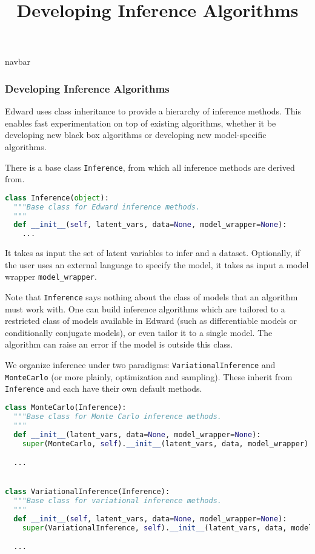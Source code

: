 \title{Developing Inference Algorithms}

{{navbar}}

\subsubsection{Developing Inference Algorithms}

Edward uses class inheritance to provide a hierarchy of inference
methods. This enables fast experimentation on top of existing
algorithms, whether it be developing new black box algorithms or
developing new model-specific algorithms.

There is a base class \texttt{Inference}, from which all inference
methods are derived from.

\begin{lstlisting}[language=Python]
class Inference(object):
  """Base class for Edward inference methods.
  """
  def __init__(self, latent_vars, data=None, model_wrapper=None):
    ...
\end{lstlisting}

It takes as input the set of latent variables to infer and a dataset. Optionally, if the user uses an external language to specify the model, it takes as input a model wrapper \texttt{model_wrapper}.

Note that \texttt{Inference} says nothing about the class of models that an
algorithm must work with. One can build inference algorithms which are
tailored to a restricted class of models available in Edward (such as
differentiable models or conditionally conjugate models), or even
tailor it to a single model. The algorithm can raise an error if the
model is outside this class.

We organize inference under two paradigms:
\texttt{VariationalInference} and \texttt{MonteCarlo} (or more plainly,
optimization and sampling). These inherit from \texttt{Inference} and each
have their own default methods.

\begin{lstlisting}[language=Python]
class MonteCarlo(Inference):
  """Base class for Monte Carlo inference methods.
  """
  def __init__(latent_vars, data=None, model_wrapper=None):
    super(MonteCarlo, self).__init__(latent_vars, data, model_wrapper)

  ...


class VariationalInference(Inference):
  """Base class for variational inference methods.
  """
  def __init__(self, latent_vars, data=None, model_wrapper=None):
    super(VariationalInference, self).__init__(latent_vars, data, model_wrapper)

  ...
\end{lstlisting}

